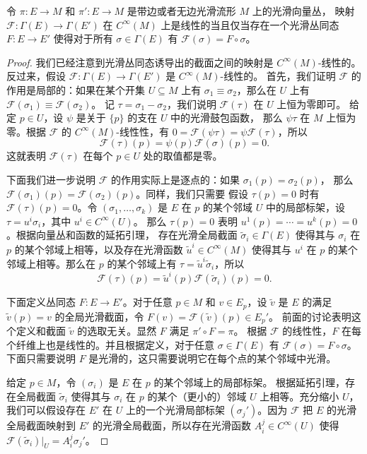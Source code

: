 \begin{lemma}[丛同态表征引理]
  令 $\pi:E\to M$ 和 $\pi':E\to M$ 是带边或者无边光滑流形 $M$ 上的光滑向量丛，
  映射 $\mathcal{F}:\Gamma(E)\to\Gamma(E')$ 在 $C^\infty(M)$
  上是线性的当且仅当存在一个光滑丛同态 $F:E\to E'$
  使得对于所有 $\sigma\in\Gamma(E)$ 有 $\mathcal{F}(\sigma)=F\circ\sigma$。
\end{lemma}
\begin{proof}
  我们已经注意到光滑丛同态诱导出的截面之间的映射是 $C^\infty(M)$-线性的。
  反过来，假设 $\mathcal{F}:\Gamma(E)\to\Gamma(E')$ 是 $C^\infty(M)$-线性的。
  首先，我们证明 $\mathcal{F}$ 的作用是局部的：如果在某个开集 $U\subseteq M$
  上有 $\sigma_1\equiv \sigma_2$，那么在 $U$ 上有 $\mathcal{F}(\sigma_1)\equiv \mathcal{F}(\sigma_2)$。
  记 $\tau=\sigma_1-\sigma_2$，我们说明 $\mathcal{F}(\tau)$ 在 $U$ 上恒为零即可。
  给定 $p\in U$，设 $\psi$ 是关于 $\{p\}$ 的支在 $U$ 中的光滑鼓包函数，
  那么 $\psi\tau$ 在 $M$ 上恒为零。根据 $\mathcal{F}$ 的 $C^\infty(M)$-线性性，有 
  $0=\mathcal{F}(\psi\tau)=\psi \mathcal{F}(\tau)$，所以
  \[
    \mathcal{F}(\tau)(p)=\psi(p)\mathcal{F}(\sigma)(p)=0.
  \]
  这就表明 $\mathcal{F}(\tau)$ 在每个 $p\in U$ 处的取值都是零。

  下面我们进一步说明 $\mathcal{F}$ 的作用实际上是逐点的：如果 $\sigma_1(p)=\sigma_2(p)$，
  那么 $\mathcal{F}(\sigma_1)(p)=\mathcal{F}(\sigma_2)(p)$。同样，我们只需要
  假设 $\tau(p)=0$ 时有 $\mathcal{F}(\tau)(p)=0$。令 $(\sigma_1,\dots,\sigma_k)$
  是 $E$ 在 $p$ 的某个邻域 $U$ 中的局部标架，设 $\tau=u^i\sigma_i$，其中 $u^i\in C^\infty(U)$。
  那么 $\tau(p)=0$ 表明 $u^1(p)=\cdots=u^k(p)=0$。根据向量丛和函数的延拓引理，
  存在光滑全局截面 $\tilde{\sigma}_i\in\Gamma(E)$ 使得其与 $\sigma_i$ 在
  $p$ 的某个邻域上相等，以及存在光滑函数 $\tilde{u}^i\in C^\infty(M)$
  使得其与 $u^i$ 在 $p$ 的某个邻域上相等。那么在 $p$ 的某个邻域上有
  $\tau=\tilde{u}^i\tilde{\sigma}_i$，所以
  \[
    \mathcal{F}(\tau)(p)=\tilde{u}^i(p) \mathcal{F}(\tilde{\sigma}_i)(p)
    =0.
  \]

  下面定义丛同态 $F:E\to E'$。对于任意 $p\in M$ 和 $v\in E_p$，设 $\tilde{v}$
  是 $E$ 的满足 $\tilde{v}(p)=v$ 的全局光滑截面，令 $F(v)=\mathcal{F}(\tilde{v})(p)\in E_p'$。
  前面的讨论表明这个定义和截面 $\tilde{v}$ 的选取无关。显然 $F$ 满足 $\pi'\circ F=\pi$。
  根据 $\mathcal{F}$ 的线性性，$F$ 在每个纤维上也是线性的。并且根据定义，对于任意
  $\sigma\in\Gamma(E)$ 有 $\mathcal{F}(\sigma)=F\circ\sigma$。下面只需要说明
  $F$ 是光滑的，这只需要说明它在每个点的某个邻域中光滑。

  给定 $p\in M$，令 $(\sigma_i)$ 是 $E$ 在 $p$ 的某个邻域上的局部标架。
  根据延拓引理，存在全局截面 $\tilde{\sigma}_i$ 使得其与 $\sigma_i$ 在 $p$
  的某个（更小的）邻域 $U$ 上相等。充分缩小 $U$，我们可以假设存在
  $E'$ 在 $U$ 上的一个光滑局部标架 $(\sigma_j')$。因为 $\mathcal{F}$
  把 $E$ 的光滑全局截面映射到 $E'$ 的光滑全局截面，所以存在光滑函数
  $A_i^j\in C^\infty(U)$ 使得 $\mathcal{F}(\tilde{\sigma}_i)|_U=A_i^j\sigma_j'$。


\end{proof}
